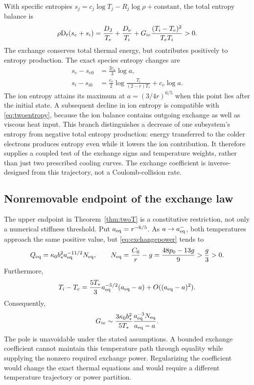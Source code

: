 \documentclass[11pt,a4paper]{article}
\theoremstyle{remark}\newtheorem{remark}{Remark}
\numberwithin{equation}{section}
\newcommand{\Dt}{\mathrm D_t}
\begin{document}
With specific entropies $s_j=c_j\log T_j-R_j\log\rho+\text{constant}$, the total entropy balance is
\begin{equation}
\rho\Dt(s_e+s_i)
=\frac{D_{\rm J}}{T_e}+\frac{D_\nu}{T_i}
+G_{ie}\frac{(T_i-T_e)^2}{T_eT_i}>0.
\label{eq:twoentropy}
\end{equation}
The exchange conserves total thermal energy, but contributes positively to entropy production. The exact species entropy changes are
\begin{equation}
\begin{aligned}
s_e-s_{e0}&=\frac{2c_v}{3}\log a,\\
s_i-s_{i0}&=\frac{c_v}{2}\log\frac{T_i}{(2-r)T_*}+c_v\log a.
\end{aligned}
\label{eq:speciesentropy}
\end{equation}
The ion entropy attains its maximum at $a=(3/4r)^{6/5}$ when this point lies after the initial state. A subsequent decline in ion entropy is compatible with \eqref{eq:twoentropy}, because the ion balance contains outgoing exchange as well as viscous heat input. This branch distinguishes a decrease of one subsystem's entropy from negative total entropy production: energy transferred to the colder electrons produces entropy even while it lowers the ion contribution. It therefore supplies a coupled test of the exchange signs and temperature weights, rather than just two prescribed cooling curves. The exchange coefficient is inverse-designed from this trajectory, not a Coulomb-collision rate.

\subsection{Nonremovable endpoint of the exchange law}
The upper endpoint in Theorem~\ref{thm:twoT} is a constitutive restriction, not only a numerical stiffness threshold. Put $a_{\rm eq}=r^{-6/5}$. As $a\to a_{\rm eq}^{-}$, both temperatures approach the same positive value, but \eqref{eq:exchangepower} tends to
\begin{equation}
Q_{\rm eq}=\kappa_0b_*^2a_{\rm eq}^{-11/2}N_{\rm eq},\qquad
N_{\rm eq}=\frac{C_0}{r}-g=\frac{48p_0-13g}{9}>\frac g3>0.
\label{eq:Qendpoint}
\end{equation}
Furthermore,
\begin{equation}
T_i-T_e=\frac{5T_*}{3}a_{\rm eq}^{-5/2}(a_{\rm eq}-a)
+O((a_{\rm eq}-a)^2).
\label{eq:Tendpoint}
\end{equation}
Consequently,
\begin{equation}
G_{ie}\sim\frac{3\kappa_0b_*^2}{5T_*}
\frac{a_{\rm eq}^{-3}N_{\rm eq}}{a_{\rm eq}-a}.
\label{eq:Gpole}
\end{equation}
The pole is unavoidable under the stated assumptions. A bounded exchange coefficient cannot maintain this temperature path through equality while supplying the nonzero required exchange power. Regularizing the coefficient would change the exact thermal equations and would require a different temperature trajectory or power partition.
\end{document}
